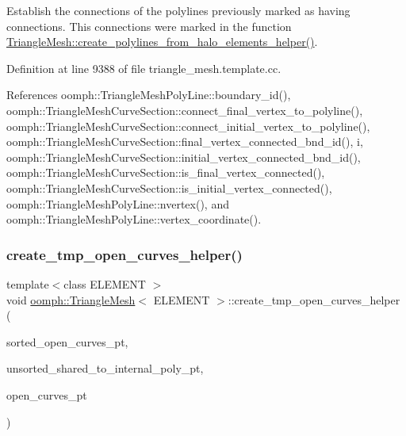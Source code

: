 Establish the connections of the polylines previously marked as having connections. This connections were marked in the function \hyperlink{classoomph_1_1TriangleMesh_a1589b532530c3a8ddfb88f93b2e832ea}{Triangle\+Mesh\+::create\+\_\+polylines\+\_\+from\+\_\+halo\+\_\+elements\+\_\+helper()}. 



Definition at line 9388 of file triangle\+\_\+mesh.\+template.\+cc.



References oomph\+::\+Triangle\+Mesh\+Poly\+Line\+::boundary\+\_\+id(), oomph\+::\+Triangle\+Mesh\+Curve\+Section\+::connect\+\_\+final\+\_\+vertex\+\_\+to\+\_\+polyline(), oomph\+::\+Triangle\+Mesh\+Curve\+Section\+::connect\+\_\+initial\+\_\+vertex\+\_\+to\+\_\+polyline(), oomph\+::\+Triangle\+Mesh\+Curve\+Section\+::final\+\_\+vertex\+\_\+connected\+\_\+bnd\+\_\+id(), i, oomph\+::\+Triangle\+Mesh\+Curve\+Section\+::initial\+\_\+vertex\+\_\+connected\+\_\+bnd\+\_\+id(), oomph\+::\+Triangle\+Mesh\+Curve\+Section\+::is\+\_\+final\+\_\+vertex\+\_\+connected(), oomph\+::\+Triangle\+Mesh\+Curve\+Section\+::is\+\_\+initial\+\_\+vertex\+\_\+connected(), oomph\+::\+Triangle\+Mesh\+Poly\+Line\+::nvertex(), and oomph\+::\+Triangle\+Mesh\+Poly\+Line\+::vertex\+\_\+coordinate().

\mbox{\label{classoomph_1_1TriangleMesh_af1eda8f65bd1578619cd4cc2ffddf692}} 
\subsubsection{\texorpdfstring{create\+\_\+tmp\+\_\+open\+\_\+curves\+\_\+helper()}{create\_tmp\_open\_curves\_helper()}}
{\footnotesize\ttfamily template$<$class E\+L\+E\+M\+E\+NT $>$ \\
void \hyperlink{classoomph_1_1TriangleMesh}{oomph\+::\+Triangle\+Mesh}$<$ E\+L\+E\+M\+E\+NT $>$\+::create\+\_\+tmp\+\_\+open\+\_\+curves\+\_\+helper (\begin{DoxyParamCaption}\item[{\hyperlink{classoomph_1_1Vector}{Vector}$<$ \hyperlink{classoomph_1_1Vector}{Vector}$<$ \hyperlink{classoomph_1_1TriangleMeshPolyLine}{Triangle\+Mesh\+Poly\+Line} $\ast$$>$ $>$ \&}]{sorted\+\_\+open\+\_\+curves\+\_\+pt,  }\item[{\hyperlink{classoomph_1_1Vector}{Vector}$<$ \hyperlink{classoomph_1_1TriangleMeshPolyLine}{Triangle\+Mesh\+Poly\+Line} $\ast$$>$ \&}]{unsorted\+\_\+shared\+\_\+to\+\_\+internal\+\_\+poly\+\_\+pt,  }\item[{\hyperlink{classoomph_1_1Vector}{Vector}$<$ \hyperlink{classoomph_1_1TriangleMeshOpenCurve}{Triangle\+Mesh\+Open\+Curve} $\ast$$>$ \&}]{open\+\_\+curves\+\_\+pt }\end{DoxyParamCaption})\hspace{0.3cm}{\ttfamily [protected]}}



